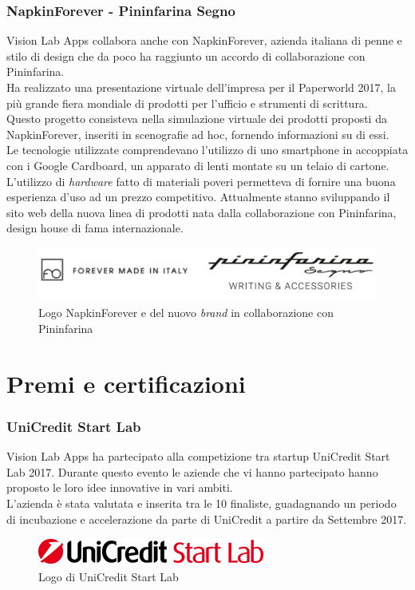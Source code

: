     \subsubsection*{NapkinForever - Pininfarina Segno}
      Vision Lab Apps collabora anche con NapkinForever, azienda italiana di penne e stilo di design che da poco ha raggiunto un accordo di collaborazione con Pininfarina.\\
      Ha realizzato una presentazione virtuale dell'impresa per il Paperworld 2017, la più grande fiera mondiale di prodotti per l'ufficio e strumenti di scrittura.\\
      Questo progetto consisteva nella simulazione virtuale dei prodotti proposti da NapkinForever, inseriti in scenografie ad hoc, fornendo informazioni su di essi.\\
      Le tecnologie utilizzate comprendevano l'utilizzo di uno smartphone in accoppiata con i Google Cardboard, un apparato di lenti montate su un telaio di cartone.
      L'utilizzo di \textit{hardware} fatto di materiali poveri permetteva di fornire una buona esperienza d'uso ad un prezzo competitivo.
      Attualmente stanno sviluppando il sito web della nuova linea di prodotti nata dalla collaborazione con Pininfarina, design house di fama internazionale.
      \begin{flushleft}
        \begin{figure}[h]
          \centering
          \includegraphics[scale=0.15]{immagini/forever.png}
          \caption{Logo NapkinForever e del nuovo \textit{brand} in collaborazione con Pininfarina}
          \label{logoNapkin}
        \end{figure}
      \end{flushleft}
  \section{Premi e certificazioni}
    \subsubsection*{UniCredit Start Lab}
    Vision Lab Apps ha partecipato alla competizione tra startup UniCredit Start Lab 2017.
    Durante questo evento le aziende che vi hanno partecipato hanno proposto le loro idee innovative in vari ambiti.\\
    L'azienda è stata valutata e inserita tra le 10 finaliste, guadagnando un periodo di incubazione e accelerazione da parte di UniCredit a partire da Settembre 2017.
    \begin{figure}[h]
      \centering
      \includegraphics[scale=0.5]{immagini/unicredit.png}
      \caption{Logo di UniCredit Start Lab}
      \label{logoUnicredit}
    \end{figure}
    \newpage
